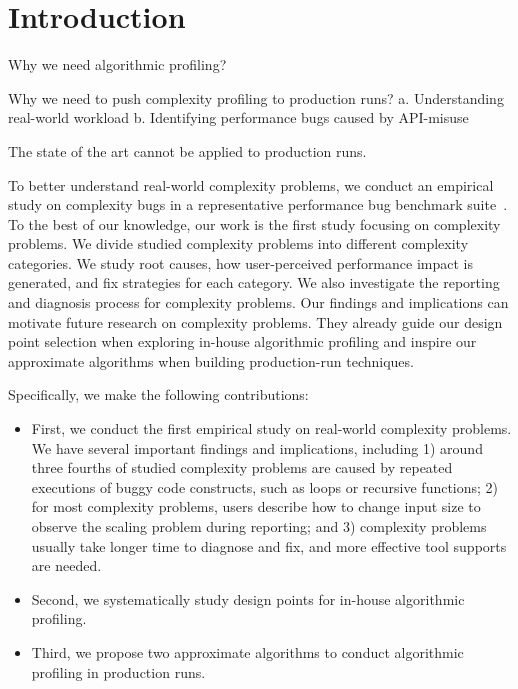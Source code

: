 \section{Introduction}
\label{sec:intro}

Why we need algorithmic profiling? 

Why we need to push complexity profiling to production runs? 
a. Understanding real-world workload
b. Identifying performance bugs caused by API-misuse

The state of the art cannot be applied to production runs. 

To better understand real-world complexity problems,
we conduct an empirical study on complexity bugs 
in a representative performance bug benchmark suite~\cite{PerfBug,SongOOPSLA2014}.
To the best of our knowledge, our work is the first study focusing on complexity problems.
We divide studied complexity problems into different complexity categories.    
We study root causes, how user-perceived performance impact is generated, 
and fix strategies for each category.
We also investigate the reporting and diagnosis process for complexity problems. 
Our findings and implications can motivate future research on complexity problems. 
They already guide our design point selection when exploring in-house algorithmic profiling 
and inspire our approximate algorithms when building production-run techniques. 




Specifically, we make the following contributions:

\begin{itemize}

\item First, we conduct the first empirical study on real-world complexity problems. 
We have several important findings and implications, including
1) around three fourths of studied complexity problems are 
caused by repeated executions of buggy code constructs,
such as loops or recursive functions;
2) for most complexity problems, 
users describe how to change input size to observe the scaling problem during reporting;
and 3) complexity problems usually take longer time to diagnose and fix, 
and more effective tool supports are needed.  




 

\item Second, we systematically study design points for in-house algorithmic profiling.

\item Third, we propose two approximate algorithms to conduct algorithmic profiling in production runs. 

\end{itemize}

